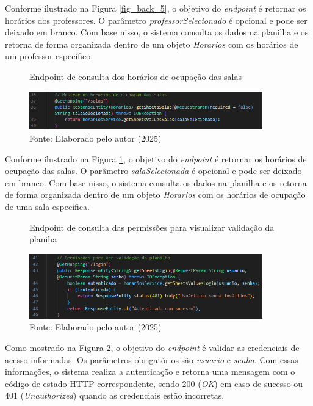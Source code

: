 \begin{itemize}
    Conforme ilustrado na Figura \ref{fig_back_5}, o objetivo do \textit{endpoint} é retornar os horários dos professores. O parâmetro \textit{professorSelecionado} é opcional e pode ser deixado em branco. Com base nisso, o sistema consulta os dados na planilha e os retorna de forma organizada dentro de um objeto \textit{Horarios} com os horários de um professor específico.

    \begin{figure}[htb]
        \centering
        \caption{Endpoint de consulta dos horários de ocupação das salas}
        \includegraphics[width=0.9\textwidth]{Figuras/back-6.png}
        \caption*{Fonte: Elaborado pelo autor (2025)}
        \label{fig_back_6}
    \end{figure}

    Conforme ilustrado na Figura \ref{fig_back_6}, o objetivo do \textit{endpoint} é retornar os horários de ocupação das salas. O parâmetro \textit{salaSelecionada} é opcional e pode ser deixado em branco. Com base nisso, o sistema consulta os dados na planilha e os retorna de forma organizada dentro de um objeto \textit{Horarios} com os horários de ocupação de uma sala específica.

    \begin{figure}[H]
        \centering
        \caption{Endpoint de consulta das permissões para visualizar validação da planiha}
        \includegraphics[width=0.9\textwidth]{Figuras/back-7.png}
        \caption*{Fonte: Elaborado pelo autor (2025)}
        \label{fig_back_7}
    \end{figure}

    Como mostrado na Figura \ref{fig_back_7}, o objetivo do \textit{endpoint} é validar as credenciais de acesso informadas. Os parâmetros obrigatórios são \textit{usuario} e \textit{senha}. Com essas informações, o sistema realiza a autenticação e retorna uma mensagem com o código de estado HTTP correspondente, sendo 200 (\textit{OK}) em caso de sucesso ou 401 (\textit{Unauthorized}) quando as credenciais estão incorretas.


\end{itemize}
